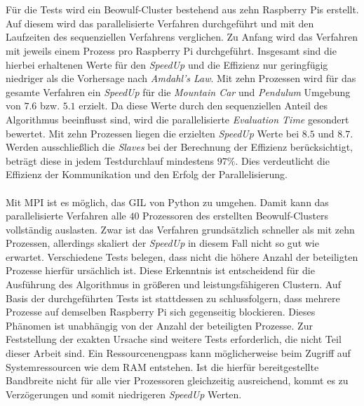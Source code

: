 \\\\
Für die Tests wird ein Beowulf-Cluster bestehend aus zehn Raspberry Pis erstellt. Auf diesem wird das parallelisierte Verfahren durchgeführt und mit den Laufzeiten des sequenziellen Verfahrens verglichen. Zu Anfang wird das Verfahren mit jeweils einem Prozess pro Raspberry Pi durchgeführt. Insgesamt sind die hierbei erhaltenen Werte für den \emph{SpeedUp} und die Effizienz nur geringfügig niedriger als die Vorhersage nach \emph{Amdahl's Law}. Mit zehn Prozessen wird für das gesamte Verfahren ein \emph{SpeedUp} für die \emph{Mountain Car} und \emph{Pendulum} Umgebung von $7.6$ bzw. $5.1$ erzielt. Da diese Werte durch den sequenziellen Anteil des Algorithmus beeinflusst sind, wird die parallelisierte \emph{Evaluation Time} gesondert bewertet. Mit zehn Prozessen liegen die erzielten \emph{SpeedUp} Werte bei $8.5$ und $8.7$. Werden ausschließlich die \emph{Slaves} bei der Berechnung der Effizienz berücksichtigt, beträgt diese in jedem Testdurchlauf mindestens $97\%$. Dies verdeutlicht die Effizienz der Kommunikation und den Erfolg der Parallelisierung.
\\\\
Mit \ac{MPI} ist es möglich, das \ac{GIL} von Python zu umgehen. Damit kann das parallelisierte Verfahren alle $40$ Prozessoren des erstellten Beowulf-Clusters vollständig auslasten. Zwar ist das Verfahren grundsätzlich schneller als mit zehn Prozessen, allerdings skaliert der \emph{SpeedUp} in diesem Fall nicht so gut wie erwartet. Verschiedene Tests belegen, dass nicht die höhere Anzahl der beteiligten Prozesse hierfür ursächlich ist. Diese Erkenntnis ist entscheidend für die Ausführung des Algorithmus in größeren und leistungsfähigeren Clustern. Auf Basis der durchgeführten Tests ist stattdessen zu schlussfolgern, dass mehrere Prozesse auf demselben Raspberry Pi sich gegenseitig blockieren. Dieses Phänomen ist unabhängig von der Anzahl der beteiligten Prozesse. Zur Feststellung der exakten Ursache sind weitere Tests erforderlich, die nicht Teil dieser Arbeit sind. Ein Ressourcenengpass kann möglicherweise beim Zugriff auf Systemressourcen wie dem \ac{RAM} entstehen. Ist die hierfür bereitgestellte Bandbreite nicht für alle vier Prozessoren gleichzeitig ausreichend, kommt es zu Verzögerungen und somit niedrigeren \emph{SpeedUp} Werten. 
\\\\
